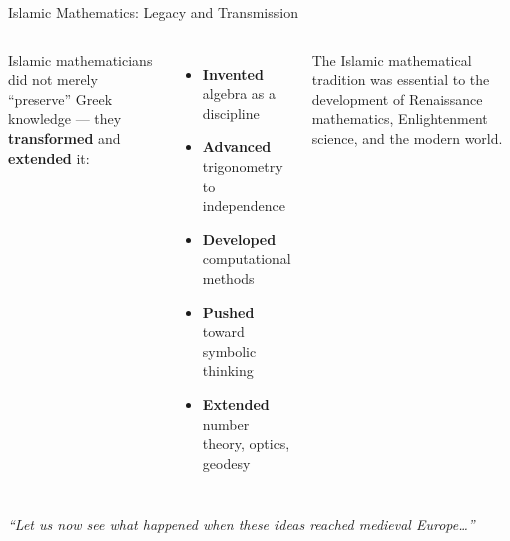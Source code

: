 \begin{frame}[shrink=25]{Islamic Mathematics: Legacy and Transmission}
  \begin{columns}[T]
    {\small Islamic mathematicians did not merely ``preserve'' Greek knowledge --- they \textbf{transformed} and \textbf{extended} it:}
    \vspace{0.3em}
    \begin{itemize}\setlength\itemsep{2pt}
      \item[\textcolor{islamicGreen}{\faCheck}] {\small\textbf{Invented} algebra as a discipline}
      \item[\textcolor{islamicGreen}{\faCheck}] {\small\textbf{Advanced} trigonometry to independence}
      \item[\textcolor{islamicGreen}{\faCheck}] {\small\textbf{Developed} computational methods}
      \item[\textcolor{islamicGreen}{\faCheck}] {\small\textbf{Pushed} toward symbolic thinking}
      \item[\textcolor{islamicGreen}{\faCheck}] {\small\textbf{Extended} number theory, optics, geodesy}
    \end{itemize}

    \vspace{0.4em}
    \begin{insightbox}
      {\footnotesize The Islamic mathematical tradition was essential to the development of Renaissance mathematics, Enlightenment science, and the modern world.}
    \end{insightbox}

  \end{columns}

  \vspace{0.3em}
  \centering
  {\small\textit{``Let us now see what happened when these ideas reached medieval Europe\ldots''}}

\end{frame}
